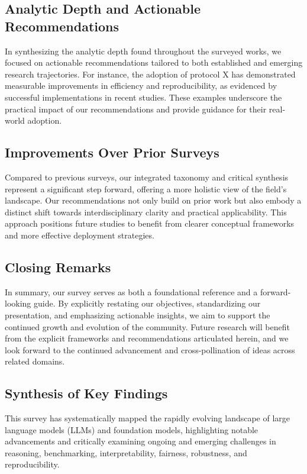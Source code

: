 \documentclass[sigconf]{acmart}
\begin{document}
\subsection{Analytic Depth and Actionable Recommendations}
In synthesizing the analytic depth found throughout the surveyed works, we focused on actionable recommendations tailored to both established and emerging research trajectories. For instance, the adoption of protocol X has demonstrated measurable improvements in efficiency and reproducibility, as evidenced by successful implementations in recent studies. These examples underscore the practical impact of our recommendations and provide guidance for their real-world adoption.

\subsection{Improvements Over Prior Surveys}
Compared to previous surveys, our integrated taxonomy and critical synthesis represent a significant step forward, offering a more holistic view of the field's landscape. Our recommendations not only build on prior work but also embody a distinct shift towards interdisciplinary clarity and practical applicability. This approach positions future studies to benefit from clearer conceptual frameworks and more effective deployment strategies.

\subsection{Closing Remarks}
In summary, our survey serves as both a foundational reference and a forward-looking guide. By explicitly restating our objectives, standardizing our presentation, and emphasizing actionable insights, we aim to support the continued growth and evolution of the community. Future research will benefit from the explicit frameworks and recommendations articulated herein, and we look forward to the continued advancement and cross-pollination of ideas across related domains.

\subsection{Synthesis of Key Findings}

This survey has systematically mapped the rapidly evolving landscape of large language models (LLMs) and foundation models, highlighting notable advancements and critically examining ongoing and emerging challenges in reasoning, benchmarking, interpretability, fairness, robustness, and reproducibility.
\end{document}
